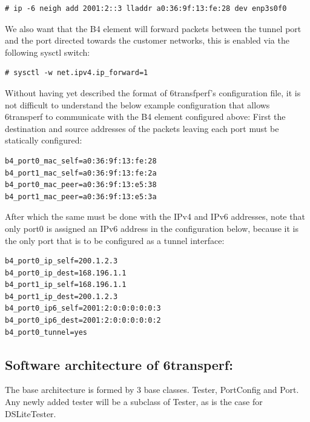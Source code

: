 \documentclass[a4paper,12p,titlepage]{article}
\begin{document}
\begin{lstlisting}
# ip -6 neigh add 2001:2::3 lladdr a0:36:9f:13:fe:28 dev enp3s0f0
\end{lstlisting}

We also want that the B4 element will forward packets between the tunnel port and the port directed towards the customer networks, this is enabled via the following sysctl switch:

\begin{lstlisting}
# sysctl -w net.ipv4.ip_forward=1
\end{lstlisting}

Without having yet described the format of 6transfperf’s configuration file, it is not difficult to understand the below example configuration that allows 6transperf to communicate with the B4 element configured above:
First the destination and source addresses of the packets leaving each port must be statically  configured:

\begin{lstlisting}
b4_port0_mac_self=a0:36:9f:13:fe:28
b4_port1_mac_self=a0:36:9f:13:fe:2a
b4_port0_mac_peer=a0:36:9f:13:e5:38
b4_port1_mac_peer=a0:36:9f:13:e5:3a
\end{lstlisting}

After which the same must be done with the IPv4 and IPv6 addresses, note that only port0 is assigned an IPv6 address in the configuration below, because it is the only port that is to be configured as a tunnel interface:

\begin{lstlisting}
b4_port0_ip_self=200.1.2.3
b4_port0_ip_dest=168.196.1.1
b4_port1_ip_self=168.196.1.1
b4_port1_ip_dest=200.1.2.3
b4_port0_ip6_self=2001:2:0:0:0:0:0:3
b4_port0_ip6_dest=2001:2:0:0:0:0:0:2
b4_port0_tunnel=yes
\end{lstlisting}

\subsection{Software architecture of 6transperf:}
The base architecture is formed by 3 base classes. Tester, PortConfig and Port. Any newly added tester will be a subclass of Tester, as is the case for DSLiteTester.
\end{document}

